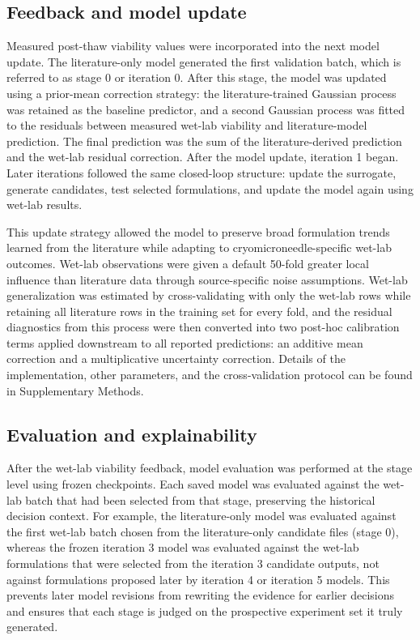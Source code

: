 \documentclass[11pt]{article}
\begin{document}
\subsection{Feedback and model update}

Measured post-thaw viability values were incorporated into the next model update. The literature-only model generated the first validation batch, which is referred to as stage 0 or iteration 0. After this stage, the model was updated using a prior-mean correction strategy: the literature-trained Gaussian process was retained as the baseline predictor, and a second Gaussian process was fitted to the residuals between measured wet-lab viability and literature-model prediction. The final prediction was the sum of the literature-derived prediction and the wet-lab residual correction. After the model update, iteration 1 began. Later iterations followed the same closed-loop structure: update the surrogate, generate candidates, test selected formulations, and update the model again using wet-lab results.

This update strategy allowed the model to preserve broad formulation trends learned from the literature while adapting to cryomicroneedle-specific wet-lab outcomes. Wet-lab observations were given a default 50-fold greater local influence than literature data through source-specific noise assumptions. Wet-lab generalization was estimated by cross-validating with only the wet-lab rows while retaining all literature rows in the training set for every fold, and the residual diagnostics from this process were then converted into two post-hoc calibration terms applied downstream to all reported predictions: an additive mean correction and a multiplicative uncertainty correction. Details of the implementation, other parameters, and the cross-validation protocol can be found in Supplementary Methods.

\subsection{Evaluation and explainability}

After the wet-lab viability feedback, model evaluation was performed at the stage level using frozen checkpoints. Each saved model was evaluated against the wet-lab batch that had been selected from that stage, preserving the historical decision context. For example, the literature-only model was evaluated against the first wet-lab batch chosen from the literature-only candidate files (stage 0), whereas the frozen iteration 3 model was evaluated against the wet-lab formulations that were selected from the iteration 3 candidate outputs, not against formulations proposed later by iteration 4 or iteration 5 models. This prevents later model revisions from rewriting the evidence for earlier decisions and ensures that each stage is judged on the prospective experiment set it truly generated.
\end{document}
